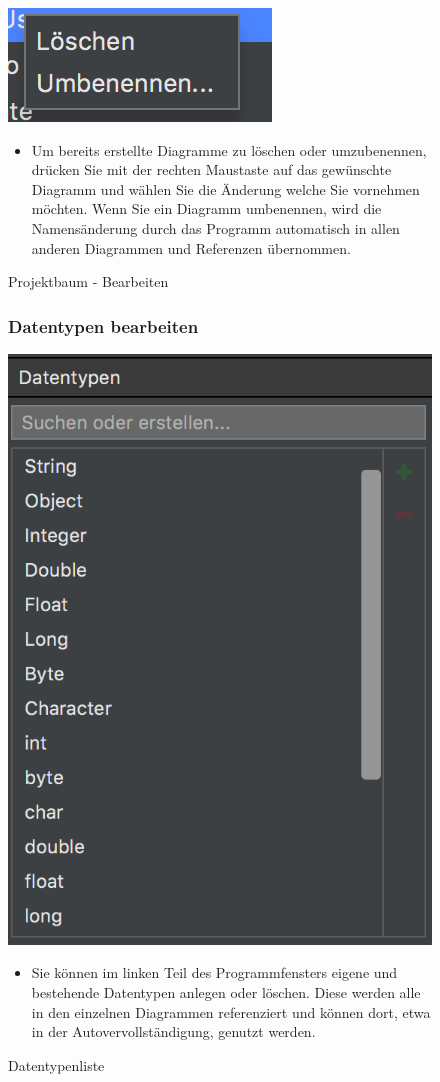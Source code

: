 \begin{figure}[h!]
	\centering
	\includegraphics[width=.4\textwidth]{Projektbaum_Bearbeiten.png}
	\caption{Projektbaum - Bearbeiten}
\begin{itemize}	
\item Um bereits erstellte Diagramme zu löschen oder umzubenennen, drücken Sie mit der rechten Maustaste auf das gewünschte Diagramm und wählen Sie die Änderung welche Sie vornehmen möchten. Wenn Sie ein Diagramm umbenennen, wird die Namensänderung durch das Programm automatisch in allen anderen Diagrammen und Referenzen übernommen.
\end{itemize}
\end{figure}


\begin{figure}[h!]
\subsubsection{Datentypen bearbeiten}
	\centering
	\includegraphics[width=.4\textwidth]{Datentypen.png}
	\caption{Datentypenliste}
\begin{itemize}	
\item Sie können im linken Teil des Programmfensters eigene und bestehende Datentypen anlegen oder löschen. Diese werden alle in den einzelnen Diagrammen referenziert und können dort, etwa in der Autovervollständigung, genutzt werden.
\end{itemize}
\end{figure}

